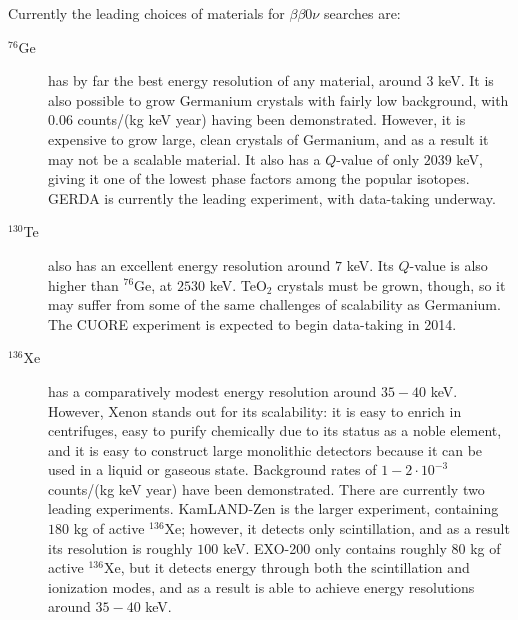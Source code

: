 Currently the leading choices of materials for $\beta\beta 0\nu$ searches are:~\cite{RMPbb0n}
\begin{description}
\item[$^{76}$Ge] has by far the best energy resolution of any material, around $3$ keV.  It is also possible to grow Germanium crystals with fairly low background, with $0.06$ counts/(kg keV year) having been demonstrated.  However, it is expensive to grow large, clean crystals of Germanium, and as a result it may not be a scalable material.  It also has a $Q$-value of only $2039$ keV, giving it one of the lowest phase factors among the popular isotopes.  GERDA is currently the leading experiment, with data-taking underway.
\item[$^{130}$Te] also has an excellent energy resolution around $7$ keV.  Its $Q$-value is also higher than $^{76}$Ge, at $2530$ keV.  TeO$_2$ crystals must be grown, though, so it may suffer from some of the same challenges of scalability as Germanium.  The CUORE experiment is expected to begin data-taking in 2014.
\item[$^{136}$Xe] has a comparatively modest energy resolution around $35-40$ keV.  However, Xenon stands out for its scalability: it is easy to enrich in centrifuges, easy to purify chemically due to its status as a noble element, and it is easy to construct large monolithic detectors because it can be used in a liquid or gaseous state.  Background rates of $1-2\cdot 10^{-3}$ counts/(kg keV year) have been demonstrated.  There are currently two leading experiments.  KamLAND-Zen is the larger experiment, containing $180$ kg of active $^{136}$Xe; however, it detects only scintillation, and as a result its resolution is roughly $100$ keV.  EXO-200 only contains roughly $80$ kg of active $^{136}$Xe, but it detects energy through both the scintillation and ionization modes, and as a result is able to achieve energy resolutions around $35-40$ keV.
\end{description}

